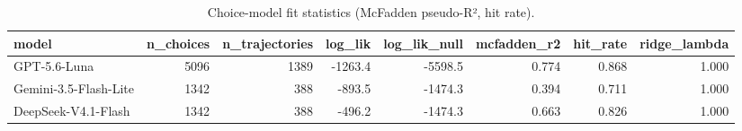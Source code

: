 \begin{table}[htbp]
\centering
\scriptsize
\caption{Choice-model fit statistics (McFadden pseudo-R², hit rate).}
\label{tab:tab19_choice_model_fit}
\begin{tabular}{lrrrrrrr}
\toprule
model & n\_choices & n\_trajectories & log\_lik & log\_lik\_null & mcfadden\_r2 & hit\_rate & ridge\_lambda \\
\midrule
GPT-5.6-Luna & 5096 & 1389 & -1263.4 & -5598.5 & 0.774 & 0.868 & 1.000 \\
Gemini-3.5-Flash-Lite & 1342 & 388 & -893.5 & -1474.3 & 0.394 & 0.711 & 1.000 \\
DeepSeek-V4.1-Flash & 1342 & 388 & -496.2 & -1474.3 & 0.663 & 0.826 & 1.000 \\
\bottomrule
\end{tabular}
\end{table}